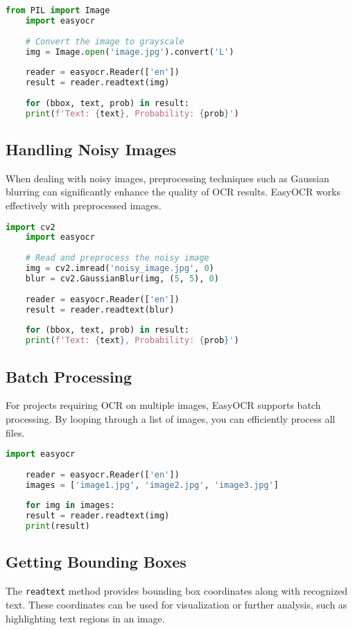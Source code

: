 \begin{lstlisting}[language=Python, caption=Reading Text from Grayscale Images]
	from PIL import Image
	import easyocr
	
	# Convert the image to grayscale
	img = Image.open('image.jpg').convert('L')
	
	reader = easyocr.Reader(['en'])
	result = reader.readtext(img)
	
	for (bbox, text, prob) in result:
	print(f'Text: {text}, Probability: {prob}')
\end{lstlisting}

\subsection{Handling Noisy Images}
When dealing with noisy images, preprocessing techniques such as Gaussian blurring can significantly enhance the quality of OCR results. EasyOCR works effectively with preprocessed images.\cite{Mahajan:2023}

\begin{lstlisting}[language=Python, caption=Handling Noisy Images]
	import cv2
	import easyocr
	
	# Read and preprocess the noisy image
	img = cv2.imread('noisy_image.jpg', 0)
	blur = cv2.GaussianBlur(img, (5, 5), 0)
	
	reader = easyocr.Reader(['en'])
	result = reader.readtext(blur)
	
	for (bbox, text, prob) in result:
	print(f'Text: {text}, Probability: {prob}')
\end{lstlisting}

\subsection{Batch Processing}
For projects requiring OCR on multiple images, EasyOCR supports batch processing. By looping through a list of images, you can efficiently process all files.\\

\begin{lstlisting}[language=Python, caption=Batch Processing with EasyOCR]
	import easyocr
	
	reader = easyocr.Reader(['en'])
	images = ['image1.jpg', 'image2.jpg', 'image3.jpg']
	
	for img in images:
	result = reader.readtext(img)
	print(result)
\end{lstlisting}

\subsection{Getting Bounding Boxes}
The \texttt{readtext} method provides bounding box coordinates along with recognized text. These coordinates can be used for visualization or further analysis, such as highlighting text regions in an image. \cite{Mahajan:2023} 

